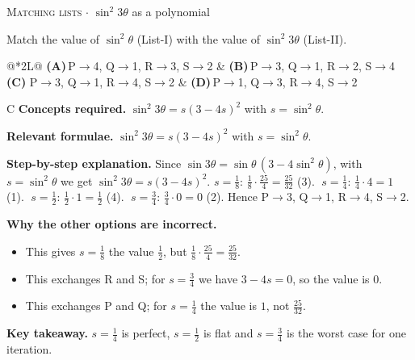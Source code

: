 \documentclass[11pt,a4paper]{article}
\newcommand{\optlabel}[1]{\textbf{(#1)}}
\newcommand{\correctlabel}[1]{\textcolor{okgreen}{\textbf{(#1)}\,\ding{51}}}
\newenvironment{qitem}[1]{\begin{list}{}{\setlength{\leftmargin}{3.3em}\setlength{\labelwidth}{3.1em}%
  \setlength{\labelsep}{0.2em}\setlength{\topsep}{3pt}\setlength{\parsep}{3pt}}\item[\textbf{Q.#1}\hfill]}{\end{list}}
\newcommand{\qsep}{\par\vspace{2pt}{\color{black!15}\hrule}\vspace{4pt}}
\newcommand{\qmeta}[2]{{\footnotesize\color{black!60}\textsc{#1} \;$\cdot$\; #2}\par}
\begin{document}
\begin{qitem}{15}
\qmeta{Matching lists}{$\sin^2 3\theta$ as a polynomial}
Match the value of $\sin^2\theta$ (List-I) with the value of $\sin^2 3\theta$ (List-II).
\par\smallskip{}
\par\smallskip\noindent\begin{tabularx}{\linewidth}{@{}*{2}{L}@{}}
\optlabel{A}\,P$\to$4, Q$\to$1, R$\to$3, S$\to$2 & \optlabel{B}\,P$\to$3, Q$\to$1, R$\to$2, S$\to$4 \\[3pt]
\correctlabel{C}\,P$\to$3, Q$\to$1, R$\to$4, S$\to$2 & \optlabel{D}\,P$\to$1, Q$\to$3, R$\to$4, S$\to$2
\end{tabularx}
\end{qitem}
\begin{solbox}{C}
\textbf{\color{brand}Concepts required.} $\sin^2 3\theta = s(3 - 4s)^2$ with $s = \sin^2\theta$.

\textbf{\color{brand}Relevant formulae.} $\sin^2 3\theta = s(3 - 4s)^2$ with $s = \sin^2\theta$.

\textbf{\color{brand}Step-by-step explanation.} Since $\sin 3\theta = \sin\theta\,(3 - 4\sin^2\theta)$, with $s = \sin^2\theta$ we get $\sin^2 3\theta = s(3 - 4s)^2$.
$s = \frac18$: $\frac18\cdot\frac{25}{4} = \frac{25}{32}$ (3). $\;s = \frac14$: $\frac14\cdot 4 = 1$ (1). $\;s = \frac12$: $\frac12\cdot 1 = \frac12$ (4).
$\;s = \frac34$: $\frac34\cdot 0 = 0$ (2). Hence P$\to$3, Q$\to$1, R$\to$4, S$\to$2.

\textbf{\color{brand}Why the other options are incorrect.}
\begin{itemize}[leftmargin=2.4em, itemsep=1pt, topsep=2pt]
\item[\textbf{(A)}] This gives $s = \frac18$ the value $\frac12$, but $\frac18\cdot\frac{25}{4} = \frac{25}{32}$.
\item[\textbf{(B)}] This exchanges R and S; for $s = \frac34$ we have $3 - 4s = 0$, so the value is $0$.
\item[\textbf{(D)}] This exchanges P and Q; for $s = \frac14$ the value is $1$, not $\frac{25}{32}$.
\end{itemize}
\textbf{\color{brand}Key takeaway.} $s = \frac14$ is perfect, $s = \frac12$ is flat and $s = \frac34$ is the worst case for one iteration.
\end{solbox}
\qsep
\end{document}
